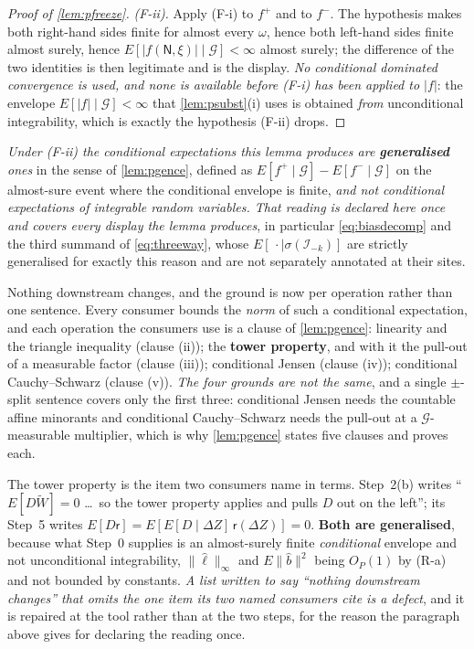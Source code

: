 \begin{proof}[Proof of \cref{lem:pfreeze}]
\emph{\textup{(F-ii)}.} Apply \textup{(F-i)} to $f^{+}$ and to $f^{-}$. The hypothesis makes both
right-hand sides finite for almost every $\omega$, hence both left-hand sides finite almost surely, hence
$E[|f(\mathsf N,\xi)|\mid\mathcal G]<\infty$ almost surely; the difference of the two identities is then
legitimate and is the display. \emph{No conditional dominated convergence is used, and none is available
before \textup{(F-i)} has been applied to $|f|$}: the envelope $E[|f|\mid\mathcal G]<\infty$ that
\cref{lem:psubst}(i) uses is obtained \emph{from} unconditional integrability, which is exactly the
hypothesis \textup{(F-ii)} drops.
\end{proof}

\begin{remark}\label{rem:pfreezeread}
\emph{Under \textup{(F-ii)} the conditional expectations this lemma produces are \textbf{generalised}
ones} in the sense of \cref{lem:pgence}, defined as $E[f^{+}\mid\mathcal G]-E[f^{-}\mid\mathcal G]$ on
the almost-sure event where the conditional envelope is finite, \emph{and not conditional expectations
of integrable random variables. That reading is declared here once and covers every display the lemma
produces}, in particular \eqref{eq:biasdecomp} and the third summand of \eqref{eq:threeway}, whose
$E[\,\cdot\mid\sigma(\mathcal I_{-k})]$ are strictly generalised for exactly this reason and are not
separately annotated at their sites.

Nothing downstream changes, and the ground is now per operation rather than one sentence. Every
consumer bounds the \emph{norm} of such a conditional expectation, and each operation the consumers use is
a clause of \cref{lem:pgence}: linearity and the triangle inequality (clause (ii)); the \textbf{tower
property}, and with it the pull-out of a measurable factor (clause (iii)); conditional Jensen (clause
(iv)); conditional Cauchy--Schwarz (clause (v)). \emph{The four grounds are not the same}, and a single
$\pm$-split sentence covers only the first three: conditional Jensen needs the countable affine minorants
and conditional Cauchy--Schwarz needs the pull-out at a $\mathcal G$-measurable multiplier, which is why
\cref{lem:pgence} states five clauses and proves each.

The tower property is the item two consumers name in terms.  Step~2(b) writes
``$E[D\widetilde W]=0$ \dots\ so the tower property applies and pulls $D$ out on the left''; its
Step~5 writes $E[D\mathsf r]=E[E[D\mid\Delta Z]\,\mathsf r(\Delta Z)]=0$. \textbf{Both are generalised}, because what
Step~0 supplies is an almost-surely finite \emph{conditional} envelope and not unconditional
integrability, $\|\hat\ell\|_\infty$ and $E\|\hat b\|^{2}$ being $O_P(1)$ by (R-a) and not bounded by
constants. \emph{A list written to say ``nothing downstream changes'' that omits the one item its two
named consumers cite is a defect}, and it is repaired at the tool rather than at the two steps, for the
reason the paragraph above gives for declaring the reading once.


\end{remark}
